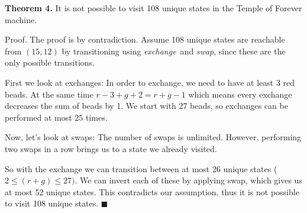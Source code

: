 \documentclass[../main.tex]{subfiles}
\begin{document}
\begin{questions}
\begin{solution}
    \textbf{Theorem 4.} It is not possible to visit 108 unique states in the Temple of Forever machine.

    Proof. The proof is by contradiction. Assume 108 unique states are reachable from $(15, 12)$ by transitioning using \textit{exchange} and \textit{swap}, since these are the only possible transitions.

    First we look at exchanges: In order to exchange, we need to have at least 3 red beads. At the same time $r-3+g+2 = r+g-1$ which means every exchange decreases the sum of beads by 1. We start with 27 beads, so exchanges can be performed at most 25 times.

    Now, let's look at swaps: The number of swaps is unlimited. However, performing two swaps in a row brings us to a state we already visited.

    So with the exchange we can transition between at most 26 unique states ($2 \le (r+g) \le 27)$. We can invert each of these by applying swap, which gives us at most 52 unique states. This contradicts our assumption, thus it is not possible to visit 108 unique states. $\blacksquare$
  \end{solution}

\end{questions}
\end{document}
